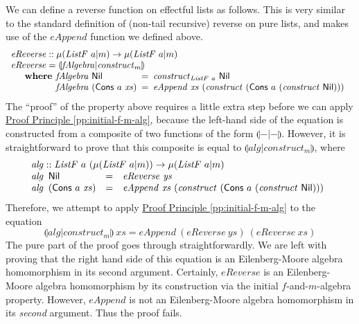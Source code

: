 \documentclass{jfp1}
\newcommand{\eFold}[2]{\llparenthesis #1|#2 \rrparenthesis}
\newcommand{\proofprinref}[1]{\hyperref[#1]{Proof Principle \ref*{#1}}}
\newcommand{\kw}[1]{\textbf{#1}}
\begin{document}
We can define a reverse function on effectful lists as follows. This
is very similar to the standard definition of (non-tail recursive)
reverse on pure lists, and makes use of the $\mathit{eAppend}$
function we defined above.
\begin{displaymath}
  \begin{array}{l}
    \mathit{eReverse} :: \mu(\mathit{ListF}~a|m) \to \mu(\mathit{ListF}~a|m) \\
    \mathit{eReverse} = \eFold{\mathit{fAlgebra}}{\mathit{construct}_m} \\
    \quad\begin{array}{r@{\hspace{0.4em}}l@{\hspace{0.5em}}c@{\hspace{0.5em}}l}
      \kw{where} & \mathit{fAlgebra}~\mathsf{Nil} &=& \mathit{construct}_{\mathit{ListF}~a}~\mathsf{Nil} \\
      & \mathit{fAlgebra}~(\mathsf{Cons}~a~\mathit{xs}) &=& \mathit{eAppend}~\mathit{xs}~(\mathit{construct}~(\mathsf{Cons}~a~(\mathit{construct}~\mathsf{Nil})))
    \end{array}
  \end{array}
\end{displaymath}
The ``proof'' of the property above requires a little extra step
before we can apply \proofprinref{pp:initial-f-m-alg}, because the
left-hand side of the equation is constructed from a composite of two
functions of the form $\eFold{-}{-}$. However, it is straightforward
to prove that this composite is equal to
$\eFold{\mathit{alg}}{\mathit{construct}_m}$, where
\begin{displaymath}
  \begin{array}{l}
    \mathit{alg} :: \mathit{ListF}~a~(\mu(\mathit{ListF}~a|m)) \to \mu(\mathit{ListF}~a|m) \\
    \begin{array}{@{}l@{\hspace{0.5em}}lcl}
      \mathit{alg}&\mathsf{Nil} &=& \mathit{eReverse}~\mathit{ys} \\
      \mathit{alg}&(\mathsf{Cons}~a~\mathit{xs}) & =& \mathit{eAppend}~\mathit{xs}~(\mathit{construct}~(\mathsf{Cons}~a~(\mathit{construct}~\mathsf{Nil})))
    \end{array}
  \end{array}
\end{displaymath}
Therefore, we attempt to apply \proofprinref{pp:initial-f-m-alg} to the equation
\begin{displaymath}
  \eFold{\mathit{alg}}{\mathit{construct}_m}~\mathit{xs} = \mathit{eAppend}~(\mathit{eReverse}~\mathit{ys})~(\mathit{eReverse}~\mathit{xs})
\end{displaymath}
The pure part of the proof goes through straightforwardly. We are left
with proving that the right hand side of this equation is an
Eilenberg-Moore algebra homomorphism in its second
argument. Certainly, $\mathit{eReverse}$ is an Eilenberg-Moore algebra
homomorphism by its construction via the initial $f$-and-$m$-algebra
property. However, $\mathit{eAppend}$ is not an Eilenberg-Moore
algebra homomorphism in its \emph{second} argument. Thus the proof
fails.
\end{document}
